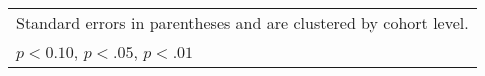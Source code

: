 \begin{table}[htbp]
\begin{adjustbox}{max width=1\textwidth}
\begin{tabular}{l*{6}{c}}
\hline\hline
\multicolumn{7}{l}{\footnotesize Standard errors in parentheses and are clustered by cohort level.}\\
\multicolumn{7}{l}{\footnotesize \sym{*} \(p<0.10\), \sym{**} \(p<.05\), \sym{***} \(p<.01\)}\\
\end{tabular}%
\end{adjustbox}
\end{table}